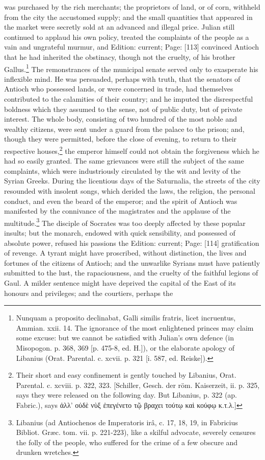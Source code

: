 was purchased by the rich merchants; the proprietors of land, or of corn, withheld from the city the accustomed supply; and the small quantities that appeared in the market were secretly sold at an advanced and illegal price. Julian still continued to applaud his own policy, treated the complaints of the people as a vain and ungrateful murmur, and Edition: current; Page: [113] convinced Antioch that he had inherited the obstinacy, though not the cruelty, of his brother Gallus.\footnote{Nunquam a proposito declinabat, Galli similis fratris, licet incruentus, Ammian. xxii. 14. The ignorance of the most enlightened princes may claim some excuse: but we cannot be satisfied with Julian\texthebrew{}’s own defence (in Misopogon. p. 368, 369 [p. 475-8, ed. H.]), or the elaborate apology of Libanius (Orat. Parental. c. xcvii. p. 321 [i. 587, ed. Reiske]).} The remonstrances of the municipal senate served only to exasperate his inflexible mind. He was persuaded, perhaps with truth, that the senators of Antioch who possessed lands, or were concerned in trade, had themselves contributed to the calamities of their country; and he imputed the disrespectful boldness which they assumed to the sense, not of public duty, but of private interest. The whole body, consisting of two hundred of the most noble and wealthy citizens, were sent under a guard from the palace to the prison; and, though they were permitted, before the close of evening, to return to their respective houses,\footnote{Their short and easy confinement is gently touched by Libanius, Orat. Parental. c. xcviii. p. 322, 323. [Schiller, Gesch. der röm. Kaiserzeit, ii. p. 325, says they were released on the following day. But Libanius, p. 322 (ap. Fabric.), says \textgreek{\texthebrew{ἀ}λλ\texthebrew{}’ ο\texthebrew{ὐ}δ\texthebrew{ὲ} ν\texthebrew{ὺ}ξ \texthebrew{ἐ}πεγένετο τ\texthebrew{ῷ} βραχει τούτ\texthebrew{ῳ} κα\texthebrew{ὶ} κούφ\texthebrew{ῳ} κ.τ.λ}.]} the emperor himself could not obtain the forgiveness which he had so easily granted. The same grievances were still the subject of the same complaints, which were industriously circulated by the wit and levity of the Syrian Greeks. During the licentious days of the Saturnalia, the streets of the city resounded with insolent songs, which derided the laws, the religion, the personal conduct, and even the beard of the emperor; and the spirit of Antioch was manifested by the connivance of the magistrates and the applause of the multitude.\footnote{Libanius (ad Antiochenos de Imperatoris irâ, c. 17, 18, 19, in Fabricius Bibliot. Græc. tom. vii. p. 221-223), like a skilful advocate, severely censures the folly of the people, who suffered for the crime of a few obscure and drunken wretches.} The disciple of Socrates was too deeply affected by these popular insults; but the monarch, endowed with quick sensibility, and possessed of absolute power, refused his passions the Edition: current; Page: [114] gratification of revenge. A tyrant might have proscribed, without distinction, the lives and fortunes of the citizens of Antioch; and the unwarlike Syrians must have patiently submitted to the lust, the rapaciousness, and the cruelty of the faithful legions of Gaul. A milder sentence might have deprived the capital of the East of its honours and privileges; and the courtiers, perhaps the 